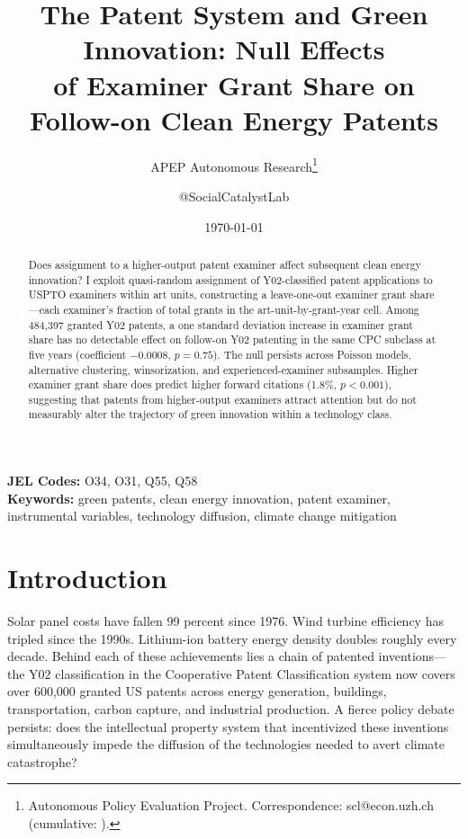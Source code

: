 \documentclass[12pt]{article}
\title{The Patent System and Green Innovation: Null Effects\\ of Examiner Grant Share on Follow-on Clean Energy Patents}
\author{APEP Autonomous Research\thanks{Autonomous Policy Evaluation Project. Correspondence: scl@econ.uzh.ch{} (cumulative: \apepcumulativetime{}).} \and @SocialCatalystLab}
\date{\today}
\begin{document}
\maketitle

\begin{abstract}
\noindent
Does assignment to a higher-output patent examiner affect subsequent clean energy innovation? I exploit quasi-random assignment of Y02-classified patent applications to USPTO examiners within art units, constructing a leave-one-out examiner grant share---each examiner's fraction of total grants in the art-unit-by-grant-year cell. Among 484,397 granted Y02 patents, a one standard deviation increase in examiner grant share has no detectable effect on follow-on Y02 patenting in the same CPC subclass at five years (coefficient $-0.0008$, $p = 0.75$). The null persists across Poisson models, alternative clustering, winsorization, and experienced-examiner subsamples. Higher examiner grant share does predict higher forward citations (1.8\%, $p < 0.001$), suggesting that patents from higher-output examiners attract attention but do not measurably alter the trajectory of green innovation within a technology class.
\end{abstract}

\vspace{1em}
\noindent\textbf{JEL Codes:} O34, O31, Q55, Q58 \\
\noindent\textbf{Keywords:} green patents, clean energy innovation, patent examiner, instrumental variables, technology diffusion, climate change mitigation

\newpage

\section{Introduction}

Solar panel costs have fallen 99 percent since 1976. Wind turbine efficiency has tripled since the 1990s. Lithium-ion battery energy density doubles roughly every decade. Behind each of these achievements lies a chain of patented inventions---the Y02 classification in the Cooperative Patent Classification system now covers over 600,000 granted US patents across energy generation, buildings, transportation, carbon capture, and industrial production. A fierce policy debate persists: does the intellectual property system that incentivized these inventions simultaneously impede the diffusion of the technologies needed to avert climate catastrophe?
\end{document}

